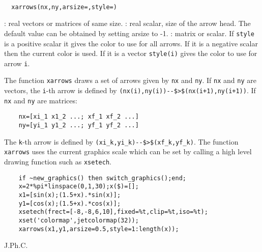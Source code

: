 
\begin{mandesc}
  \\ %
\end{mandesc}
\begin{calling_sequence}
\begin{verbatim}
  xarrows(nx,ny,arsize=,style=)  
\end{verbatim}
\end{calling_sequence}
\begin{parameters}
  \begin{varlist}
    : real vectors or matrices of same size.
    : real scalar, size of the arrow head. The default value can be obtained  by setting arsize to -1.
    : matrix or scalar. If \verb!style! is a positive scalar it
    gives the color to use for all arrows. If it is a negative scalar then the
    current color is used. If it is a vector \verb!style(i)! gives the color to
    use for arrow \verb!i!.
  \end{varlist}
\end{parameters}

\begin{mandescription}
  The function \verb!xarrows! draws a set of arrows given by \verb!nx! and \verb!ny!.
  If \verb!nx! and \verb!ny! are vectors, the \verb!i!-th arrow is defined by
  \verb!(nx(i),ny(i))--$>$(nx(i+1),ny(i+1))!.
  If \verb!nx! and \verb!ny! are matrices:
  \begin{Verbatim}
    nx=[xi_1 x1_2 ...; xf_1 xf_2 ...]
    ny=[yi_1 y1_2 ...; yf_1 yf_2 ...]
  \end{Verbatim}

  The \verb!k!-th arrow is defined by \verb!(xi_k,yi_k)--$>$(xf_k,yf_k)!. 
  The function \verb!xarrows! uses the current graphics scale 
  which can be set by calling a high level drawing function such as \verb!xsetech!.
\end{mandescription}
\begin{examples}
  \begin{Verbatim}
    if ~new_graphics() then switch_graphics();end;
    x=2*%pi*linspace(0,1,30);x($)=[];
    x1=[sin(x);(1.5+x).*sin(x)];
    y1=[cos(x);(1.5+x).*cos(x)];
    xsetech(frect=[-8,-8,6,10],fixed=%t,clip=%t,iso=%t);
    xset('colormap',jetcolormap(32));
    xarrows(x1,y1,arsize=0.5,style=1:length(x));
  \end{Verbatim}
\end{examples}
\begin{authors}
  J.Ph.C.  
\end{authors}

